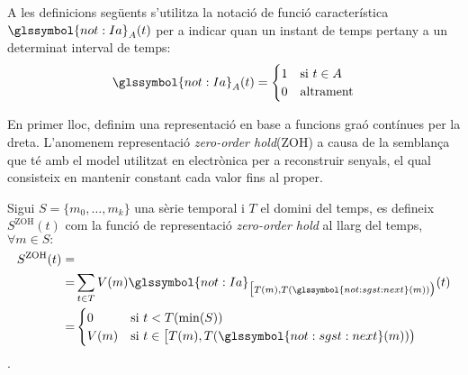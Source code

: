 A les definicions següents s'utilitza la notació de funció
característica $\glssymbol{not:Ia}_A(t)$ per a indicar quan un instant
de temps pertany a un determinat interval de temps:
\[
\glssymbol{not:Ia}_A(t) = 
   \begin{cases}
      1 & \text{si } t\in A \\
      0 & \text{altrament}
    \end{cases}
\]



En primer lloc, definim una representació en base a funcions graó
contínues per la dreta. L'anomenem representació \emph{zero-order
  hold}(ZOH) a causa de la semblança que té amb el model utilitzat en
electrònica per a reconstruir senyals, el qual consisteix en mantenir
constant cada valor fins al proper.
\begin{definition}
  Sigui $S=\{m_0,\ldots,m_k\}$ una sèrie temporal i $T$ el domini del
  temps, es defineix $S^\text{ZOH}(t)$ com la funció de representació
  \emph{zero-order hold} al llarg del temps, $\forall m \in S:$
  \begin{align*}
    S^\text{ZOH}(t) = &  \\
    = & \sum_{t\in T} V(m) \glssymbol{not:Ia}_{\big[T(m), T(\glssymbol{not:sgst:next}(m)) \big)}(t)\\
    = & \begin{cases}
      0 & \text{si }  t<T(\min(S)) \\
      V(m) & \text{si } t\in
      \big[T(m),T(\glssymbol{not:sgst:next}(m))\big)
    \end{cases}
         \end{align*}.
\end{definition}



